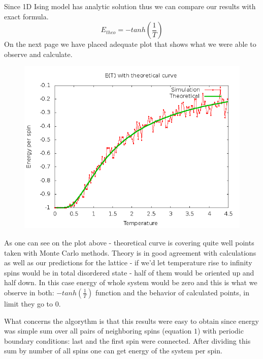 \documentclass[a4paper,12pt,titlepage]{article}
\begin{document}
  Since 1D Ising model has analytic solution thus we can compare our results with exact formula.
  \begin{equation}
    E_{theo}=-tanh\left(\frac{1}{T}\right)
  \end{equation}
  On the next page we have placed adequate plot that shows what we were able to observe and calculate.
  \newpage
  \begin{figure}[h]
    \centering
    \includegraphics[scale=0.5]{plots/IsingTestE1D_teo.png}
  \end{figure}
  As one can see on the plot above - theoretical curve is covering quite well points taken with Monte Carlo methods. Theory is in good
  agreement with calculations as well as our predictions for the lattice - if we'd let temperature rise to infinity spins would be in
  total disordered state - half of them would be oriented up and half down. In this case energy of whole system would be zero and this
  is what we observe in both: $-tanh\left(\frac{1}{T}\right)$ function and the behavior of calculated points, in limit they go to $0$.
 
  What concerns the algorythm is that this results were easy to obtain since energy was simple sum over all pairs of neighboring spins (equation $1$)
  with periodic boundary conditions: last and the first spin were connected. After dividing this sum by number of all spins one can get energy of the
  system per spin.
 
\end{document}
